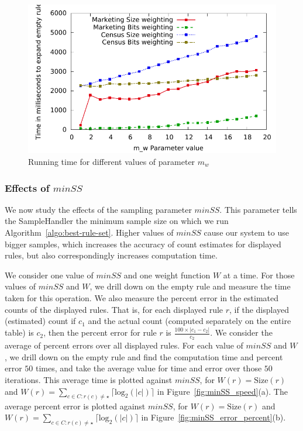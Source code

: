 \begin{figure}
\vspace{-5pt}
\centering
  \includegraphics[scale=0.46]{graphs/mw_speed.pdf}%
\vspace{-10pt}
  \caption{Running time for different values of parameter $m_w$ \label{fig:mw_speed}}
\vspace{-15pt}
\end{figure}

\subsubsection{Effects of $minSS$}
We now study the effects of the sampling parameter $minSS$. This parameter tells the SampleHandler the minimum sample size on which we run Algorithm~\ref{algo:best-rule-set}.   Higher values of $minSS$ cause our system to use bigger samples, which increases the accuracy of count estimates for displayed rules, but also correspondingly increases computation time. 

We consider one value of $minSS$ and one weight function $W$ at a time. For those values of $minSS$ and $W$, we drill down on the empty rule and measure the time taken for this operation. We also measure the percent error in the estimated counts of the displayed rules. That is, for each displayed rule $r$, if the displayed (estimated) count if $c_1$ and the actual count (computed separately on the entire table) is $c_2$, then the percent error for rule $r$ is $\frac{100 \times |c_1-c_2|}{c_2}$. We consider the average of percent errors over all displayed rules. For each value of $minSS$ and $W$, we drill down on the empty rule and find the computation time and percent error $50$ times, and take the average value for time and error over those $50$ iterations. This average time is plotted against $minSS$, for $W(r) = \text{Size}(r)$ and $W(r) = \sum_{c \in C : r(c) \neq \star} \lceil \text{log}_2(|c|) \rceil$ in Figure~\ref{fig:minSS_speed}(a). The average percent error is plotted against $minSS$, for $W(r) = \text{Size}(r)$ and $W(r) = \sum_{c \in C : r(c) \neq \star} \lceil \text{log}_2(|c|) \rceil$ in Figure~\ref{fig:minSS_error_percent}(b). 

